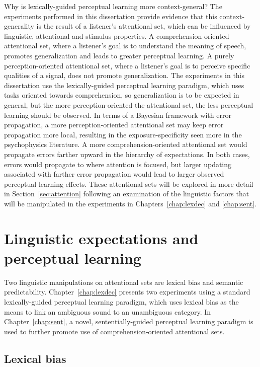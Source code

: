 Why is lexically-guided perceptual learning more context-general?
The experiments performed in this dissertation provide evidence that this context-generality is the result of a listener's attentional set, which can be influenced by linguistic, attentional and stimulus properties.
A comprehension-oriented attentional set, where a listener's goal is to understand the meaning of speech, promotes generalization and leads to greater perceptual learning.  
A purely perception-oriented attentional set, where a listener's goal is to perceive specific qualities of a signal, does not promote generalization.
The experiments in this dissertation use the lexically-guided perceptual learning paradigm, which uses tasks oriented towards comprehension, so generalization is to be expected in general, but the more perception-oriented the attentional set, the less perceptual learning should be observed.
In terms of a Bayesian framework with error propagation, a more perception-oriented attentional set may keep error propagation more local, resulting in the exposure-specificity seen more in the psychophysics literature.
A more comprehension-oriented attentional set would propagate errors farther upward in the hierarchy of expectations.
In both cases, errors would propagate to where attention is focused, but larger updating associated with farther error propagation would lead to larger observed perceptual learning effects.
These attentional sets will be explored in more detail in Section~\ref{sec:attention} following an examination of the linguistic factors that will be manipulated in the experiments in Chapters~\ref{chap:lexdec} and \ref{chap:sent}.

\section{Linguistic expectations and perceptual learning}
\label{sec:linguistic}

Two linguistic manipulations on attentional sets are lexical bias and semantic predictability.
Chapter~\ref{chap:lexdec} presents two experiments using a standard lexically-guided perceptual learning paradigm, which uses lexical bias as the means to link an ambiguous sound to an unambiguous category.
In Chapter~\ref{chap:sent}, a novel, sententially-guided perceptual learning paradigm is used to further promote use of comprehension-oriented attentional sets.

\subsection{Lexical bias}
\label{sec:lexicalbias}

